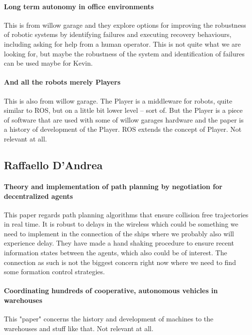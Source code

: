 \paragraph{Long term autonomy in office environments}
This is from willow garage and they explore options for improving the robustness of robotic systems by identifying failures and executing recovery behaviours, including asking for help from a human operator.
This is not quite what we are looking for, but maybe the robustness of the system and identification of failures can be used maybe for Kevin.

\paragraph{And all the robots merely Players}
This is also from willow garage. The Player is a middleware for robots, quite similar to ROS, but on a little bit lower level -- sort of. But the Player is a piece of software that are used with some of willow garages hardware and the paper is a history of development of the Player. ROS extends the concept of Player. Not relevant at all.


\subsection{Raffaello D'Andrea}

\paragraph{Theory and implementation of path planning by negotiation for decentralized agents}
This paper regards path planning algorithms that ensure collision free trajectories in real time. It is robust to delays in the wireless which could be something we need to implement in the connection of the ships where we probably also will experience delay. They have made a hand shaking procedure to ensure recent information states between the agents, which also could be of interest.
The connection as such is not the biggest concern right now where we need to find some formation control strategies.

{\vskip0pt\color{gray}
\paragraph{Coordinating hundreds of cooperative, autonomous vehicles in warehouses}
This "paper" concerns the history and development of machines to the warehouses and stuff like that.
Not relevant at all.}

